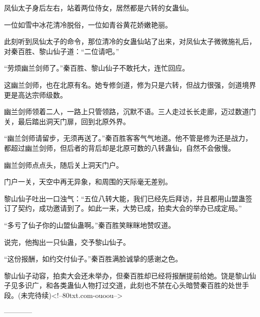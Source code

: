 \begin{this_body}
凤仙太子身后左右，站着两位侍女，居然都是六转的女蛊仙。

一位如雪中冰花清冷脱俗，一位如青谷黄花娇嫩艳丽。

此刻听到凤仙太子的命令，那位清冷的女蛊仙站了出来，对凤仙太子微微施礼后，对秦百胜、黎山仙子道：“二位请吧。”

“劳烦幽兰剑师了。”秦百胜、黎山仙子不敢托大，连忙回应。

这幽兰剑师，也在北原有名。她专修剑道，修为只是六转，但战力很强，剑道境界更是高达宗师级数。

幽兰剑师领着二人，一路上只管领路，沉默不语。三人走过长长走廊，迈过数道门关，最后踏出洞天门扉，回到北原外界。

“幽兰剑师请留步，无须再送了。”秦百胜客客气气地道。他不管是修为还是战力，都超过幽兰剑师，但后者的背后却是北原可数的八转蛊仙，自然不会傲慢。

幽兰剑师点点头，随后关上洞天门户。

门户一关，天空中再无异象，和周围的天际毫无差别。

黎山仙子吐出一口浊气：“五位八转大能，我们已经先后拜访，并且都用山盟蛊签订了契约，成功邀请到了。如此一来，大势已成，拍卖大会的举办已成定局。”

“多亏了仙子你的山盟仙蛊啊。”秦百胜笑眯眯地赞叹道。

说完，他掏出一只仙蛊，交予黎山仙子。

“这份报酬，如约交付仙子。”秦百胜满脸诚挚的感谢之色。

黎山仙子动容，拍卖大会还未举办，但秦百胜却已经将报酬提前给她。饶是黎山仙子见多识广，和各类蛊仙人物打过交道，此刻也不禁在心头暗赞秦百胜的处世手段。(未完待续)<!--80txt.com-ouoou-->

------------

\end{this_body}

